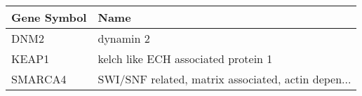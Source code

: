 \begin{tabular}{ll}
\toprule
Gene Symbol &                                               Name \\
\midrule
       DNM2 &                                          dynamin 2 \\
      KEAP1 &                kelch like ECH associated protein 1 \\
    SMARCA4 & SWI/SNF related, matrix associated, actin depen... \\
\bottomrule
\end{tabular}
